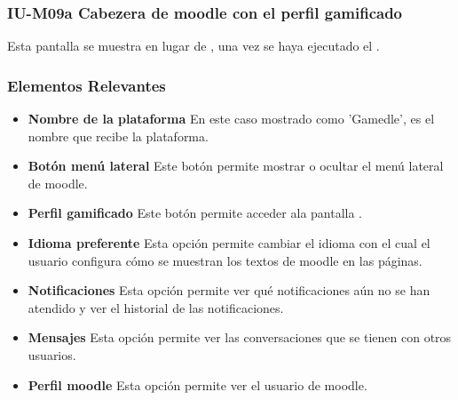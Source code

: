 
\subsubsection{IU-M09a Cabezera de moodle con el perfil gamificado}

    Esta pantalla se muestra en lugar de , una vez se haya ejecutado el .


\subsubsection{Elementos Relevantes}

    \begin{itemize}
        \item {\bf Nombre de la plataforma}
            En este caso mostrado como 'Gamedle', es el nombre que recibe la plataforma.
        \item {\bf Botón menú lateral}
            Este botón permite mostrar o ocultar el menú lateral de moodle.
        \item {\bf Perfil gamificado}
            Este botón permite acceder ala pantalla .
        \item {\bf Idioma preferente}
            Esta opción permite cambiar el idioma con el cual el usuario configura cómo se muestran los textos de moodle en las páginas.
        \item {\bf Notificaciones}
            Esta opción permite ver qué notificaciones aún no se han atendido y ver el historial de las notificaciones.
        \item {\bf Mensajes}
            Esta opción permite ver las conversaciones que se tienen con otros usuarios.
        \item {\bf Perfil moodle}
            Esta opción permite ver el usuario de moodle.
    \end{itemize}


\clearpage
